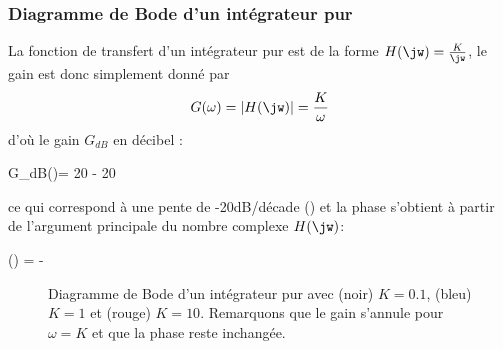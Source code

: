 \subsubsection{Diagramme de Bode d'un intégrateur pur}
La fonction de transfert d'un intégrateur pur est de la forme 
$H(\jw)=\frac{K}{\jw}$, le gain est donc simplement donné par 
\[
G(\omega)=|H(\jw)|=\frac{K}{\omega}
\] 
d'où le gain $G_{dB}$ en décibel :
\begin{bequation}
G_{dB}(\omega)= 20 - 20\log{\omega}
\end{bequation} ce qui correspond à une pente de -20dB/décade 
() et la phase s'obtient à partir de l'argument principale 
du nombre complexe $H(\jw)$:
\begin{bequation}
\phi(\omega) = -
\end{bequation}
\begin{figure}[!htb]
    \centering
    

    
    \caption{Diagramme de Bode d'un intégrateur pur avec (noir) 
             $K=0.1$, (bleu) $K=1$ et (rouge) $K=10$. Remarquons 
             que le gain s'annule pour $\omega=K$ et que la phase reste 
             inchangée.\label{fig-bode_int}}
\end{figure}
\newpage

